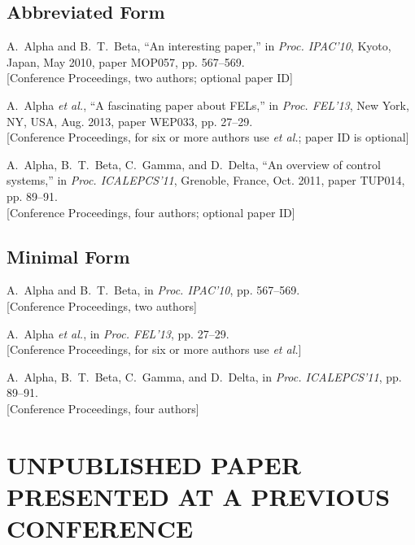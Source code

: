 \documentclass[letterpaper,  %
              ]{jacow-2_3}   %
\begin{document}
{{\newpage
\subsection{Abbreviated Form}

\begin{thebibliography}{9} %
	A.~Alpha and B.~T.~Beta, “An interesting paper,”
	in \textit{Proc. IPAC’10}, 
	Kyoto, Japan, May 2010, 
	paper MOP057, pp. 567--569.\\
	\textcolor{jgreen}{[Conference Proceedings, two authors; optional paper ID]}
	
	A.~Alpha \emph{et al.}, 
	“A fascinating paper about FELs,”
	in \emph{Proc. FEL’13}, 
	New York, NY, USA, Aug. 2013, 
	paper WEP033, pp. 27--29.\\
	\textcolor{jgreen}{[Conference Proceedings, for six or more authors use \emph{et al.};	
		paper ID is optional]}
	
	A.~Alpha, B.~T.~Beta, C.~Gamma, and D.~Delta, 
	“An overview of control systems,”
	in \emph{Proc. ICALEPCS’11}, Grenoble, France, Oct. 2011, 
	paper TUP014, pp. 89--91.\\
	\textcolor{jgreen}{[Conference Proceedings, four authors; optional paper ID]}
\end{thebibliography}

\subsection{Minimal Form}

\begin{thebibliography}{9} %

	A.~Alpha and B.~T.~Beta,
	in \textit{Proc. IPAC’10}, 
	pp. 567--569.\\
	\textcolor{jgreen}{[Conference Proceedings, two authors]}
	
	A.~Alpha \emph{et al.}, 
	in \emph{Proc. FEL’13}, 
	pp. 27--29.\\
	\textcolor{jgreen}{[Conference Proceedings, for six or more authors use \emph{et al.}]}
	
	A.~Alpha, B.~T.~Beta, C.~Gamma, and D.~Delta, 
	in \emph{Proc. ICALEPCS’11}, 
	pp. 89--91.\\
	\textcolor{jgreen}{[Conference Proceedings, four authors]}
\end{thebibliography}

\section{UNPUBLISHED PAPER PRESENTED AT A PREVIOUS CONFERENCE}

}}
\end{document}
